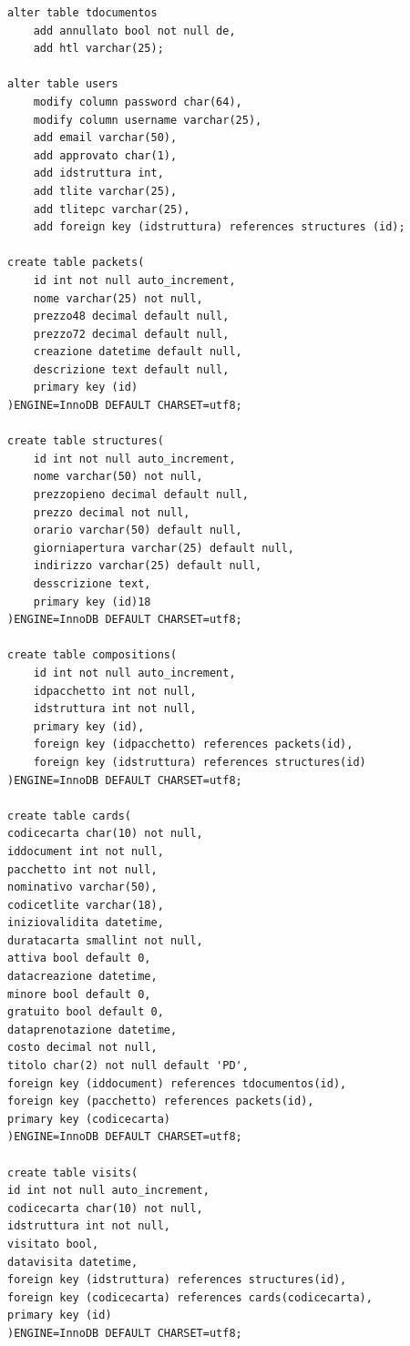 \begin{center}
\begin{lstlisting}
alter table tdocumentos
	add annullato bool not null de,
    add htl varchar(25);
    
alter table users
	modify column password char(64),
    modify column username varchar(25),
    add email varchar(50),
    add approvato char(1),
    add idstruttura int,
    add tlite varchar(25),
	add tlitepc varchar(25),
    add foreign key (idstruttura) references structures (id);

create table packets(
	id int not null auto_increment,
	nome varchar(25) not null,
    prezzo48 decimal default null,
    prezzo72 decimal default null,
    creazione datetime default null,
	descrizione text default null,
	primary key (id)
)ENGINE=InnoDB DEFAULT CHARSET=utf8; 
	
create table structures(
	id int not null auto_increment,
    nome varchar(50) not null,
    prezzopieno decimal default null,
    prezzo decimal not null,
    orario varchar(50) default null,
    giorniapertura varchar(25) default null,
    indirizzo varchar(25) default null,
    desscrizione text,
	primary key (id)18
)ENGINE=InnoDB DEFAULT CHARSET=utf8;

create table compositions(
	id int not null auto_increment,
    idpacchetto int not null,
    idstruttura int not null,
    primary key (id),
    foreign key (idpacchetto) references packets(id),
    foreign key (idstruttura) references structures(id)
)ENGINE=InnoDB DEFAULT CHARSET=utf8;

create table cards(
codicecarta char(10) not null,
iddocument int not null,
pacchetto int not null,
nominativo varchar(50),
codicetlite varchar(18),
iniziovalidita datetime,
duratacarta smallint not null,
attiva bool default 0,
datacreazione datetime,
minore bool default 0,
gratuito bool default 0,
dataprenotazione datetime,
costo decimal not null,
titolo char(2) not null default 'PD',
foreign key (iddocument) references tdocumentos(id),
foreign key (pacchetto) references packets(id),
primary key (codicecarta)
)ENGINE=InnoDB DEFAULT CHARSET=utf8;

create table visits(
id int not null auto_increment,
codicecarta char(10) not null,
idstruttura int not null,
visitato bool,
datavisita datetime,
foreign key (idstruttura) references structures(id),
foreign key (codicecarta) references cards(codicecarta),
primary key (id)
)ENGINE=InnoDB DEFAULT CHARSET=utf8;
\end{lstlisting}
\end{center}
